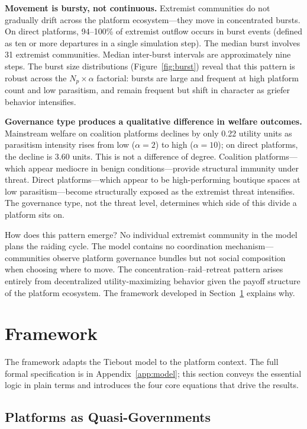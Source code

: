\documentclass{article}
\begin{document}
\textbf{Movement is bursty, not continuous.} Extremist communities do not gradually drift across the platform ecosystem---they move in concentrated bursts. On direct platforms, 94--100\% of extremist outflow occurs in burst events (defined as ten or more departures in a single simulation step). The median burst involves 31 extremist communities. Median inter-burst intervals are approximately nine steps. The burst size distributions (Figure~\ref{fig:burst}) reveal that this pattern is robust across the $N_p \times \alpha$ factorial: bursts are large and frequent at high platform count and low parasitism, and remain frequent but shift in character as griefer behavior intensifies.

\textbf{Governance type produces a qualitative difference in welfare outcomes.} Mainstream welfare on coalition platforms declines by only 0.22 utility units as parasitism intensity rises from low ($\alpha = 2$) to high ($\alpha = 10$); on direct platforms, the decline is 3.60 units. This is not a difference of degree. Coalition platforms---which appear mediocre in benign conditions---provide structural immunity under threat. Direct platforms---which appear to be high-performing boutique spaces at low parasitism---become structurally exposed as the extremist threat intensifies. The governance type, not the threat level, determines which side of this divide a platform sits on.

How does this pattern emerge? No individual extremist community in the model plans the raiding cycle. The model contains no coordination mechanism---communities observe platform governance bundles but not social composition when choosing where to move. The concentration--raid--retreat pattern arises entirely from decentralized utility-maximizing behavior given the payoff structure of the platform ecosystem. The framework developed in Section~\ref{sec:framework} explains why.

\section{Framework}
\label{sec:framework}

The framework adapts the Tiebout model to the platform context. The full formal specification is in Appendix~\ref{app:model}; this section conveys the essential logic in plain terms and introduces the four core equations that drive the results.

\subsection{Platforms as Quasi-Governments}
\end{document}
